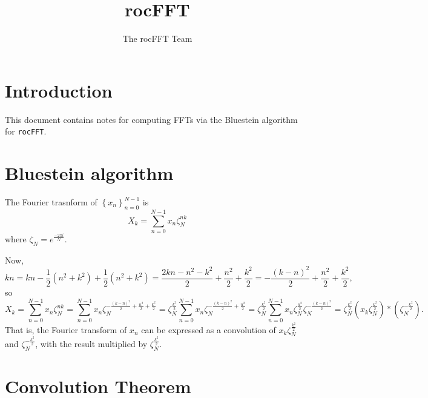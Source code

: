 \documentclass[12pt]{article}
\title{ rocFFT}
\author{The rocFFT Team}
\renewcommand{\(}{\left(}
\renewcommand{\)}{\right)}
\begin{document}
\maketitle

\section{Introduction}

This document contains notes for computing FFTs via the Bluestein
algorithm for \texttt{rocFFT}.

\section{Bluestein algorithm}

The Fourier trasnform of $\left\{x_n\right\}_{n=0}^{N-1}$ is
\begin{dmath}
  X_k = \sum_{n=0}^{N-1}x_n \zeta_N^{nk}
\end{dmath}
where $\zeta_N = e^{\frac{-2\pi i}{N}}$.

Now,
\begin{dmath}
  kn
  = kn -\frac{1}{2}\(n^2 + k^2\) +\frac{1}{2}\(n^2 + k^2\)
  = \frac{2kn - n^2 - k^2}{2} + \frac{n^2}{2} + \frac{k^2}{2}
  = -\frac{\(k-n\)^2}{2} + \frac{n^2}{2} + \frac{k^2}{2},
\end{dmath}
so
\begin{dmath}
  X_k
  = \sum_{n=0}^{N-1}x_n \zeta_N^{nk}
  = \sum_{n=0}^{N-1}x_n \zeta_N^{-\frac{\(k-n\)^2}{2} + \frac{n^2}{2} + \frac{k^2}{2}}
  = \zeta_N^{\frac{k^2}{2}}
  \sum_{n=0}^{N-1}x_n \zeta_N^{-\frac{\(k-n\)^2}{2} + \frac{n^2}{2}}
  = \zeta_N^{\frac{k^2}{2}}
  \sum_{n=0}^{N-1}x_n \zeta_N^{\frac{n^2}{2}}\zeta_N^{-\frac{\(k-n\)^2}{2}}
  = \zeta_N^{\frac{k^2}{2}}
 \(x_k\zeta_N^{\frac{k^2}{2}}\) * \(\zeta_N^{-\frac{k^2}{2}} \).
\end{dmath}
That is, the Fourier transform of $x_n$ can be expressed as a
convolution of $x_k\zeta_N^{\frac{k^2}{2}}$ and
$\zeta_N^{-\frac{k^2}{2}}$, with the result multiplied by
$\zeta_N^{\frac{k^2}{2}}$.

\section{Convolution Theorem}
\end{document}
